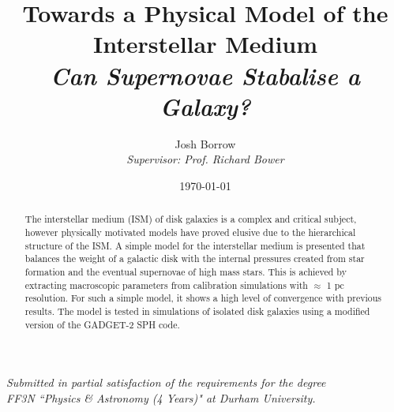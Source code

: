 
\begin{titlepage}

\thispagestyle{empty}

\author{Josh Borrow\\
\vspace{10mm}
\emph{Supervisor: Prof. Richard Bower}\\
\vspace{10mm}}
\date{\today}
\title{Towards a Physical Model of the Interstellar Medium\\
\vspace{4mm}
\large \emph{Can Supernovae Stabalise a Galaxy?}
\vspace{20mm}}
\maketitle

\vspace{20mm}

\begin{center}
\emph{{\small Submitted in partial satisfaction of the requirements for the degree}}\\
\emph{{\small FF3N ``Physics \& Astronomy (4 Years)" at Durham University.}}
\end{center}

\vspace{40mm}
\begin{abstract}
The interstellar medium (ISM) of disk galaxies is a complex and critical subject, however physically motivated models have proved elusive due to the hierarchical structure of the ISM. A simple model for the interstellar medium is presented that balances the weight of a galactic disk with the internal pressures created from star formation and the eventual supernovae of high mass stars. This is achieved by extracting macroscopic parameters from calibration simulations with $\approx$ 1 pc resolution. For such a simple model, it shows a high level of convergence with previous results. The model is tested in simulations of isolated disk galaxies using a modified version of the GADGET-2 SPH code.
\end{abstract}

\end{titlepage}

\newpage

